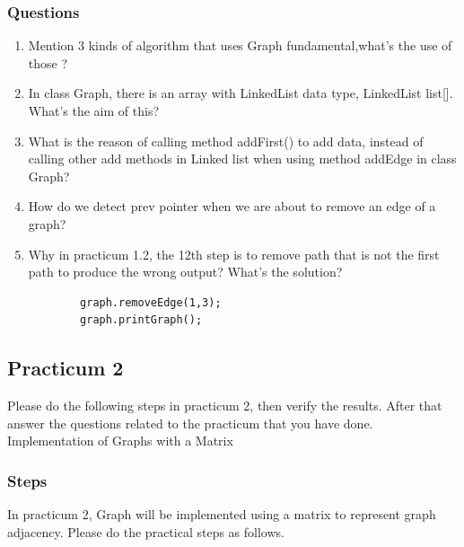 \documentclass[12pt,titlepage]{article}
\begin{document}
\subsubsection{Questions}
\begin{enumerate}
    \item Mention 3 kinds of algorithm that uses Graph fundamental,what’s the use of those ?
    \item In class Graph, there is an array with LinkedList data type, LinkedList list[]. What’s the aim of this?
    \item What is the reason of calling method addFirst() to add data, instead of calling other add methods in Linked list when using method addEdge in class Graph?
    \item How do we detect prev pointer when we are about to remove an edge of a graph?
    \item Why in practicum 1.2, the 12th step is to remove path that is not the first path to produce the wrong output? What’s the solution?
    \begin{verbatim}
        graph.removeEdge(1,3);
        graph.printGraph();
    \end{verbatim}
\end{enumerate}

\subsection{Practicum 2}
Please do the following steps in practicum 2, then verify the results. After that answer the questions related to the practicum that you have done. Implementation of Graphs with a Matrix

\subsubsection{Steps}
In practicum 2, Graph will be implemented using a matrix to represent graph adjacency. Please do the practical steps as follows.
\end{document}
